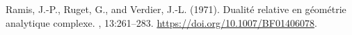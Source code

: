 Ramis, J.-P., Ruget, G., and Verdier, J.-L. (1971).
\newblock Dualit{\'e} relative en g{\'e}om{\'e}trie analytique complexe.
, 13:261--283.
\newblock \url{https://doi.org/10.1007/BF01406078}.

